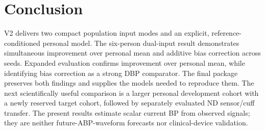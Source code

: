 \documentclass[conference]{IEEEtran}
\begin{document}
\section{Conclusion}
V2 delivers two compact population input modes and an explicit,
reference-conditioned personal model. The six-person dual-input result
demonstrates simultaneous improvement over personal mean and additive bias
correction across seeds. Expanded evaluation confirms improvement over personal
mean, while identifying bias correction as a strong DBP comparator. The final
package preserves both findings and supplies the models needed to reproduce
them. The next scientifically useful comparison is a larger personal
development cohort with a newly reserved target cohort, followed by separately
evaluated ND sensor/cuff transfer. The present results estimate scalar current
BP from observed signals; they are neither future-ABP-waveform forecasts nor
clinical-device validation.



\clearpage



\clearpage



\end{document}

